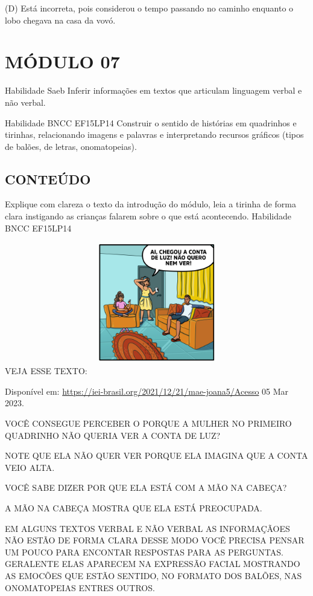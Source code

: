 (D) Está incorreta, pois considerou o tempo passando no caminho enquanto
o lobo chegava na casa da
vovó.\protect\hypertarget{_heading=h.ha8xhwafzqp2}{}{\protect\hypertarget{_heading=h.7wgwl7ctcj2x}{}{}}

\section{MÓDULO 07}\label{muxf3dulo-07}

Habilidade Saeb Inferir informações em textos que articulam linguagem
verbal e não verbal.

Habilidade BNCC EF15LP14 Construir o sentido de histórias em quadrinhos
e tirinhas, relacionando imagens e palavras e interpretando recursos
gráficos (tipos de balões, de letras, onomatopeias).

\subsection{CONTEÚDO}\label{conteuxfado-6}

Explique com clareza o texto da introdução do módulo, leia a tirinha de
forma clara instigando as crianças falarem sobre o que está acontecendo.
Habilidade BNCC EF15LP14

\includegraphics[width=5.76119in,height=2.06716in]{media/image125.jpeg}VEJA
ESSE TEXTO:

Disponível em: \url{https://iei-brasil.org/2021/12/21/mae-joana5/Acesso}
05 Mar 2023.

VOCÊ CONSEGUE PERCEBER O PORQUE A MULHER NO PRIMEIRO QUADRINHO NÃO
QUERIA VER A CONTA DE LUZ?

NOTE QUE ELA NÃO QUER VER PORQUE ELA IMAGINA QUE A CONTA VEIO ALTA.

VOCÊ SABE DIZER POR QUE ELA ESTÁ COM A MÃO NA CABEÇA?

A MÃO NA CABEÇA MOSTRA QUE ELA ESTÁ PREOCUPADA.

EM ALGUNS TEXTOS VERBAL E NÃO VERBAL AS INFORMAÇÃOES NÃO ESTÃO DE FORMA
CLARA DESSE MODO VOCÊ PRECISA PENSAR UM POUCO PARA ENCONTAR RESPOSTAS
PARA AS PERGUNTAS. GERALENTE ELAS APARECEM NA EXPRESSÃO FACIAL MOSTRANDO
AS EMOCÕES QUE ESTÃO SENTIDO, NO FORMATO DOS BALÕES, NAS ONOMATOPEIAS
ENTRES OUTROS.


